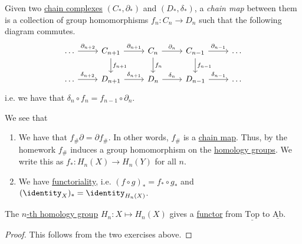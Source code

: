 \begin{definition}\label{def:chain-map}
	Given two \hyperref[def:chain-complex]{chain complexes} \((C_\ast, \partial_\ast)\) and \((D_\ast, \delta_\ast)\), a
	\emph{chain map} between them is a collection of group homomorphisms \(f_n \colon C_n \to D_n\) such that the following diagram commutes.
	\[
		\begin{tikzcd}
			\ldots & {C_{n+1}} & {C_n} & {C_{n-1}} & \ldots \\
			\ldots & {D_{n+1}} & {D_n} & {D_{n-1}} & \ldots
			\arrow["{\partial_{n+2}}", from=1-1, to=1-2]
			\arrow["{\delta_{n+2}}", from=2-1, to=2-2]
			\arrow["{\delta_{n+1}}", from=2-2, to=2-3]
			\arrow["{\delta_{n}}", from=2-3, to=2-4]
			\arrow["{\partial_{n-1}}", from=1-4, to=1-5]
			\arrow["{\partial_{n}}", from=1-3, to=1-4]
			\arrow["{\partial_{n+1}}", from=1-2, to=1-3]
			\arrow["{\delta_{n-1}}", from=2-4, to=2-5]
			\arrow["{f_{n-1}}", from=1-4, to=2-4]
			\arrow["{f_{n}}", from=1-3, to=2-3]
			\arrow["{f_{n+1}}", from=1-2, to=2-2]
		\end{tikzcd}
	\]
	i.e. we have that \(\delta_n \circ f_n = f_{n - 1} \circ \partial_n\).
\end{definition}

\begin{exercise}
	We see that
	\begin{enumerate}
		\item We have that \(f_{\#} \partial = \partial f_{\#}\). In other words, \(f_{\#}\) is a \hyperref[def:chain-map]{chain map}.
		      Thus, by the homework \(f_{\#}\) induces a group homomorphism on the \hyperref[def:homology-group]{homology groups}. We write
		      this as \(f_\ast \colon H_n(X) \to H_n(Y)\) for all \(n\).
		\item We have \underline{functoriality}, i.e. \((f \circ g)_\ast = f_\ast \circ g_\ast\) and \((\identity_X)_\ast = \identity_{H_n(X)}\).
	\end{enumerate}
\end{exercise}

\begin{theorem}\label{thm:homology-group-defines-a-functor}
	The \hyperref[def:homology-group]{\(n\)-th homology group} \(H_n \colon X \mapsto H_n(X)\) gives a \hyperref[def:functor]{functor} from \(\underline{\mathrm{Top}}\)
	to \(\underline{\mathrm{Ab} }\).
\end{theorem}
\begin{proof}
	This follows from the two exercises above.
\end{proof}

